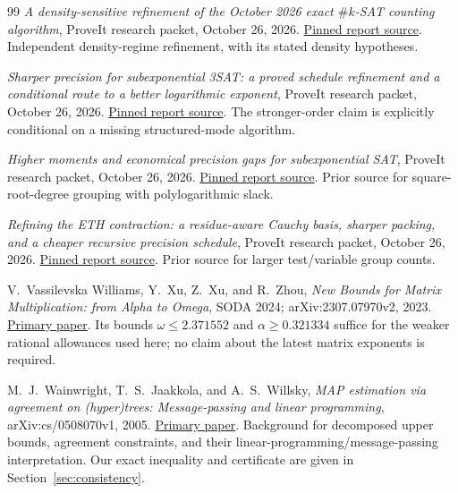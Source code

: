 \begin{thebibliography}{99}
\emph{A density-sensitive refinement of the October 2026 exact $\#k$-SAT counting algorithm}, ProveIt research packet, October 26, 2026. \href{https://github.com/VladimirReshetnikov/ProveIt/blob/8e76d515063c4b9fbd8743a846b457e3a01bc039/Computability/SubexponentialSAT/Research/eth_density_refinement/report.tex}{Pinned report source}. Independent density-regime refinement, with its stated density hypotheses.

\emph{Sharper precision for subexponential 3SAT: a proved schedule refinement and a conditional route to a better logarithmic exponent}, ProveIt research packet, October 26, 2026. \href{https://github.com/VladimirReshetnikov/ProveIt/blob/8e76d515063c4b9fbd8743a846b457e3a01bc039/Computability/SubexponentialSAT/Research/3sat_precision_refinement/report.tex}{Pinned report source}. The stronger-order claim is explicitly conditional on a missing structured-mode algorithm.

\emph{Higher moments and economical precision gaps for subexponential SAT}, ProveIt research packet, October 26, 2026. \href{https://github.com/VladimirReshetnikov/ProveIt/blob/8e76d515063c4b9fbd8743a846b457e3a01bc039/Computability/SubexponentialSAT/Research/eth_high_moment/report.tex}{Pinned report source}. Prior source for square-root-degree grouping with polylogarithmic slack.

\emph{Refining the ETH contraction: a residue-aware Cauchy basis, sharper packing, and a cheaper recursive precision schedule}, ProveIt research packet, October 26, 2026. \href{https://github.com/VladimirReshetnikov/ProveIt/blob/8e76d515063c4b9fbd8743a846b457e3a01bc039/Computability/SubexponentialSAT/Research/eth_recursive_refinement/report.tex}{Pinned report source}. Prior source for larger test/variable group counts.

V.~Vassilevska Williams, Y.~Xu, Z.~Xu, and R.~Zhou, \emph{New Bounds for Matrix Multiplication: from Alpha to Omega}, SODA 2024; arXiv:2307.07970v2, 2023. \href{https://arxiv.org/abs/2307.07970v2}{Primary paper}. Its bounds $\omega\le2.371552$ and $\alpha\ge0.321334$ suffice for the weaker rational allowances used here; no claim about the latest matrix exponents is required.

M.~J.~Wainwright, T.~S.~Jaakkola, and A.~S.~Willsky, \emph{MAP estimation via agreement on (hyper)trees: Message-passing and linear programming}, arXiv:cs/0508070v1, 2005. \href{https://arxiv.org/abs/cs/0508070v1}{Primary paper}. Background for decomposed upper bounds, agreement constraints, and their linear-programming/message-passing interpretation. Our exact inequality and certificate are given in Section~\ref{sec:consistency}.


\end{thebibliography}
